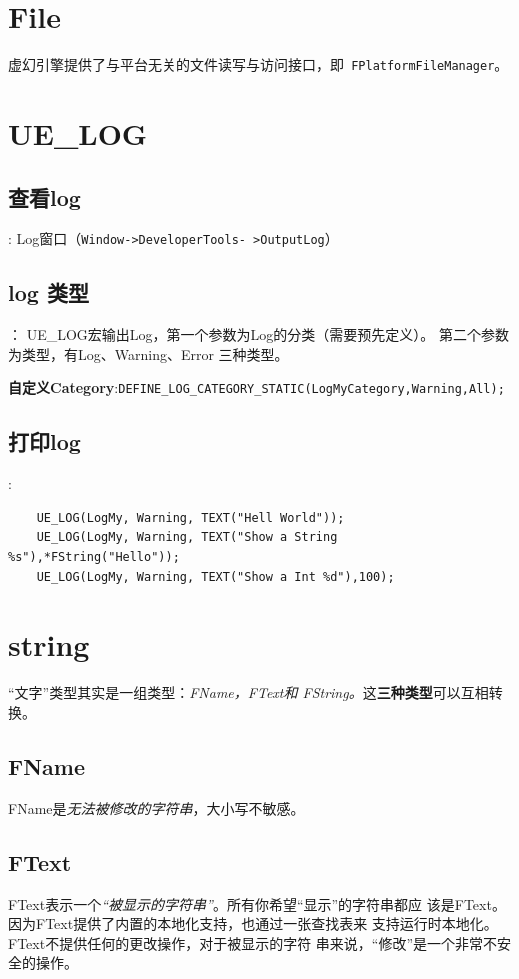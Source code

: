 \documentclass[UTF8,a4paper,12pt]{ctexbook}
\begin{document}
	\section{File}
		虚幻引擎提供了与平台无关的文件读写与访问接口，即\verb| FPlatformFileManager|。
	
	\section{UE\_LOG}
		\subsection{查看log}:
			Log窗口（\verb|Window->DeveloperTools- >OutputLog|）
		
		\subsection{log 类型}：
			UE\_LOG宏输出Log，第一个参数为Log的分类（需要预先定义）。 第二个参数为类型，有Log、Warning、Error 三种类型。
			
			\textbf{自定义Category}:\verb|DEFINE_LOG_CATEGORY_STATIC(LogMyCategory,Warning,All);|
			
		\subsection{打印log}:
			\begin{lstlisting}
	UE_LOG(LogMy, Warning, TEXT("Hell World")); 
	UE_LOG(LogMy, Warning, TEXT("Show a String %s"),*FString("Hello")); 
	UE_LOG(LogMy, Warning, TEXT("Show a Int %d"),100);			
			\end{lstlisting}
			
	\section{string}
		“文字”类型其实是一组类型：\textit{FName，FText和 FString。}这\textbf{三种类型}可以互相转换。
		
		\subsection{FName}
			FName是\textit{无法被修改的字符串}，大小写不敏感。
			
		\subsection{FText}
			FText表示一个\textit{“被显示的字符串”}。所有你希望“显示”的字符串都应 该是FText。因为FText提供了内置的本地化支持，也通过一张查找表来 支持运行时本地化。FText不提供任何的更改操作，对于被显示的字符 串来说，“修改”是一个非常不安全的操作。
			
\end{document}
